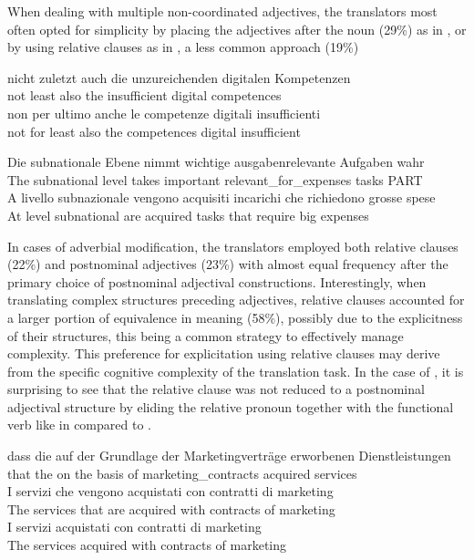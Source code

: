 \documentclass[output=paper,colorlinks,citecolor=brown]{langscibook}
\begin{document}
When dealing with multiple non-coordinated adjectives, the translators most often opted for simplicity by placing the adjectives after the noun (29\%) as in , or by using relative clauses as in , a less common approach (19\%)

\ea%
    \label{ex:resi:46}
    \ea
\gll nicht  zuletzt  auch  die  unzureichenden  digitalen  Kompetenzen \\
      not  least  also  the  insufficient  digital  competences     \\
\ex
\gll   non  per ultimo  anche  le  competenze  digitali  insufficienti      \\
     not    for least  also  the  competences  digital  insufficient      \\
\z
\z

\ea%
    \label{ex:resi:47}
\ea
\gll Die  subnationale  Ebene  nimmt  wichtige  ausgabenrelevante  Aufgaben  wahr \\
     The  subnational  level  takes  important  relevant\_for\_expenses  tasks  PART     \\

\ex
\gll  A  livello subnazionale  vengono  acquisiti  incarichi  che  richiedono  grosse  spese\\
      At level subnational     are  acquired         tasks  that  require  big  expenses\\
\z
\z

In cases of adverbial modification, the translators employed both relative clauses (22\%) and postnominal adjectives (23\%) with almost equal frequency after the primary choice of postnominal adjectival constructions. Interestingly, when translating complex structures preceding adjectives, relative clauses accounted for a larger portion of equivalence in meaning (58\%), possibly due to the explicitness of their structures, this being a common strategy to effectively manage complexity. This preference for explicitation using relative clauses may derive from the specific cognitive complexity of the translation task. In the case of , it is surprising to see that the relative clause was not reduced to a postnominal adjectival structure by eliding the relative pronoun together with the functional verb like in  compared to .

\ea%
    \label{ex:resi:48}
    \ea \label{ex:resi:48a}
\gll dass  die  auf  der  Grundlage  der  Marketingverträge  erworbenen  Dienstleistungen \\
    that  the  on  the  basis  of  marketing\_contracts  acquired  services \\
\ex \label{ex:resi:48b}
    \gll I  servizi  che  vengono  acquistati  con  contratti  di  marketing\\
    The  services  that  are  acquired  with   contracts  of  marketing  \\
 \ex \label{ex:resi:48c}
   \gll  I  servizi  acquistati  con  contratti  di  marketing\\
    The  services  acquired  with   contracts  of  marketing\\
  \z
\z
\end{document}
